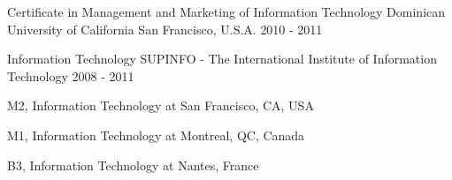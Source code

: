 \begin{cventries}
  \cventry
    {Certificate in Management and Marketing of Information Technology}
    {Dominican University of California}
    {San Francisco, U.S.A.}
    {2010 - 2011}
    {
      \begin{cvitems}
      \end{cvitems}
    }
    
  \cventry
    {Information Technology}
    {SUPINFO - The International Institute of Information Technology}
    {}
    {2008 - 2011}
    {
      \begin{cvitems}
        \item {M2, Information Technology at \textcolor{awesome-red}{San Francisco, CA, USA}}
        \item {M1, Information Technology at \textcolor{awesome-red}{Montreal, QC, Canada}}
        \item {B3, Information Technology at \textcolor{awesome-red}{Nantes, France}}
      \end{cvitems}
    }
\end{cventries}
